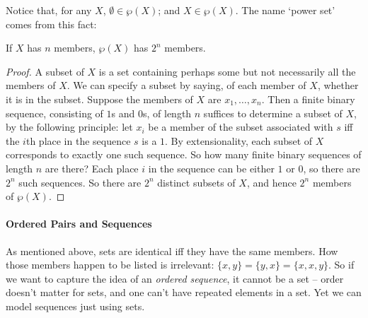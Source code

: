 Notice that, for any $X$, $\emptyset \in \wp(X)$; and $X \in \wp(X)$. The name `power set' comes from this fact: 
\begin{theorem} If $X$ has $n$ members, $\wp(X)$ has $2^{n}$ members. 
	\begin{proof}
		A subset of $X$ is a set containing perhaps some but not necessarily all the members of $X$. We can specify a subset by saying, of each member of $X$, whether it is in the subset.  Suppose the members of $X$ are $x_{1},\ldots,x_{n}$. Then a finite binary sequence, consisting of $1$s and $0$s, of length $n$ suffices to determine a subset of $X$, by the following principle: let $x_{i}$ be a member of the subset associated with $s$ iff the $i$th place in the sequence $s$ is a $1$. By extensionality, each subset of $X$ corresponds to exactly one such sequence. So how many finite binary sequences of length $n$ are there? Each place $i$ in the sequence can be either $1$ or $0$, so there are $2^{n}$ such sequences. So there are $2^n$ distinct subsets of $X$, and hence $2^{n}$ members of $\wp(X)$. 
	\end{proof}
 \end{theorem}

\paragraph{Ordered Pairs and Sequences}

As mentioned above, sets are identical iff they have the same members. How those members happen to be listed is irrelevant: $\{x,y\}=\{y,x\}=\{x,x,y\}$. So if we want to capture the idea of an \emph{ordered sequence}, it cannot be a set – order doesn't matter for sets, and one can't have repeated elements in a set. Yet we can model sequences just using sets.

